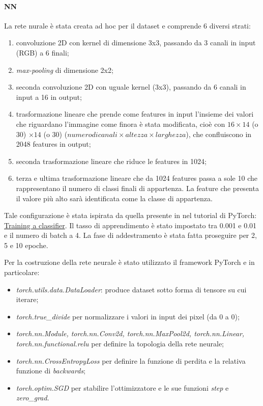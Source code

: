\documentclass[11pt, a4paper, titlepage]{article}
\begin{document}
\paragraph{NN}
La rete nurale è stata creata ad hoc per il dataset e comprende 6 diversi strati:
\begin{enumerate}
    \item convoluzione 2D con kernel di dimensione 3x3, passando da 3 canali in input (RGB) a 6 finali;
    \item \emph{max-pooling} di dimensione 2x2;
    \item seconda convoluzione 2D con uguale kernel (3x3), passando da 6 canali in input a 16 in output;
    \item trasformazione lineare che prende come features in input l'insieme dei valori che riguardano l'immagine come finora è stata modificata, cioè con $16 \times 14$ (o 30) $\times 14$ (o 30) ($numero di canali \times altezza \times larghezza$), che confluiscono in 2048 features in output;
    \item seconda trasformazione lineare che riduce le features in 1024;
    \item terza e ultima trasformazione lineare che da 1024 features passa a sole 10 che rappresentano il numero di classi finali di appartenza. La feature che presenta il valore più alto sarà identificata come la classe di appartenza.
\end{enumerate}
Tale configurazione è stata ispirata da quella presente in nel tutorial di PyTorch: \href{https://pytorch.org/tutorials/beginner/blitz/cifar10_tutorial.html}{Training a classifier}. Il tasso di apprendimento è stato impostato tra 0.001 e 0.01 e il numero di batch a 4. La fase di addestramento è stata fatta proseguire per 2, 5 e 10 epoche. 

\medskip 
Per la costruzione della rete neurale è stato utilizzato il framework PyTorch \cite{pytorch} e in particolare:
\begin{itemize}
    \item \emph{torch.utils.data.DataLoader}: produce dataset sotto forma di tensore su cui iterare;
    \item \emph{torch.true\_divide} per normalizzare i valori in input dei pixel (da 0 a 0);
    \item \emph{torch.nn.Module, torch.nn.Conv2d, torch.nn.MaxPool2d, torch.nn.Linear, torch.nn.functional.relu} per definire la topologia della rete neurale;
    \item \emph{torch.nn.CrossEntropyLoss} per definire la funzione di perdita e la relativa funzione di \emph{backwards};
    \item \emph{torch.optim.SGD} per stabilire l'ottimizzatore e le sue funzioni \emph{step} e \emph{zero\_grad}.
\end{itemize}
\end{document}
